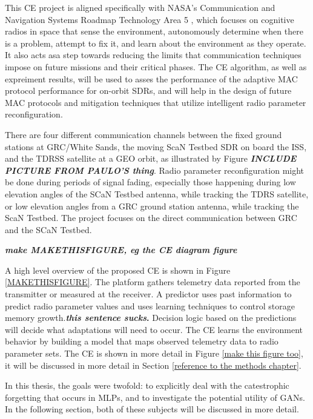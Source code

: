 \documentclass[11pt]{report}
\begin{document}
	\par This CE project is aligned specifically with NASA's Communication and Navigation Systems Roadmap Technology Area 5 \cite{somecitation}, which focuses on cognitive radios in space that sense the environment, autonomously determine when there is a problem, attempt to fix it, and learn about the environment as they operate. It also acts asa step towards reducing the limits that communication techniques impose on future missions and their critical phases. The CE algorithm, as well as expreiment results, will be used to asses the performance of the adaptive MAC protocol performance for on-orbit SDRs, and will help in the design of future MAC protocols and mitigation techniques that utilize intelligent radio parameter reconfiguration. 
	\par There are four different communication channels between the fixed ground stations at GRC/White Sands, the moving ScaN Testbed SDR on board the ISS, and the TDRSS satellite at a GEO orbit, as illustrated by Figure \textbf{\textit{INCLUDE PICTURE FROM PAULO'S thing}}. Radio parameter reconfiguration might be done during periods of signal fading, especially those happening during low elevation angles of the SCaN Testbed antenna, while tracking the TDRS satellite, or low elevation angles from a GRC ground station antenna, while tracking the ScaN Testbed. The project focuses on the direct communication between GRC and the SCaN Testbed.
	\par\textbf{\textit{make MAKETHISFIGURE, eg the CE diagram figure}}
	\par A high level overview of the proposed CE is shown in Figure \ref{MAKETHISFIGURE}. The platform gathers telemetry data reported from the transmitter or measured at the receiver. A predictor uses past information to predict radio parameter values and uses learning techniques to control storage memory growth.\textbf{\textit{this sentence sucks}.} Decision logic based on the predictions will decide what adaptations will need to occur. The CE learns the environment behavior by building a model that maps observed telemetry data to radio parameter sets. The CE is shown in more detail in Figure \ref{make this figure too}, it will be discussed in more detail in Section \ref{reference to the methods chapter}.
	\par In this thesis, the goals were twofold: to explicitly deal with the catestrophic forgetting that occurs in MLPs, and to investigate the potential utility of GANs. In the following section, both of these subjects will be discussed in more detail.
	
\end{document}
